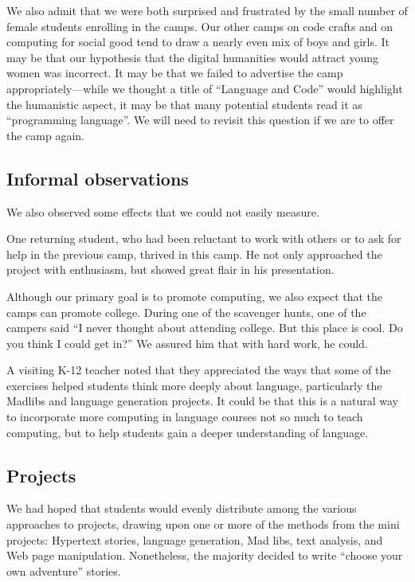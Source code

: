We also admit that we were both surprised and frustrated by the
small number of female students enrolling in the camps.  Our other
camps on code crafts and on computing for social good tend to draw
a nearly even mix of boys and girls.  It may be that our hypothesis
that the digital humanities would attract young women was incorrect.
It may be that we failed to advertise the camp appropriately---while
we thought a title of ``Language and Code'' would highlight the
humanistic aspect, it may be that many potential students read it
as ``programming language''.  We will need to revisit this question
if we are to offer the camp again.

\subsection{Informal observations}

We also observed some effects that we could not easily measure.

One returning student, who had been reluctant to work with others
or to ask for help in the previous camp, thrived in this camp.  He not
only approached the project with enthusiasm, but showed great
flair in his presentation.

Although our primary goal is to promote computing, we also expect
that the camps can promote college.  During one of the scavenger
hunts, one of the campers said ``I never thought about attending
college.  But this place is cool.  Do you think I could get in?''
We assured him that with hard work, he could.

A visiting K-12 teacher noted that they appreciated the ways that
some of the exercises helped students think more deeply about
language, particularly the Madlibs and language generation projects.
It could be that this is a natural way to incorporate more computing
in language courses not so much to teach computing, but to help
students gain a deeper understanding of language.

\subsection{Projects}

We had hoped that students would evenly distribute among the various
approaches to projects, drawing upon one or more of the methods
from the mini projects: Hypertext stories, language generation, Mad
libs, text analysis, and Web page manipulation.  Nonetheless, the
majority decided to write ``choose your own adventure'' stories.


